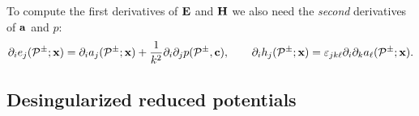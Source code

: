 \documentclass[letterpaper]{article}
\begin{document}
To compute the first derivatives of $\mathbf{E}$ and $\mathbf{H}$ we also
need the \textit{second} derivatives of $\mathbf{a}$ and $p$:
$$ \partial_i e_j(\mathcal{P}^\pm; \mathbf{x})
   =   \partial_i a_j(\mathcal{P}^\pm; \mathbf{x}) 
     + \frac{1}{k^2}\partial_i \partial_j p(\mathcal{P}^\pm, \mathbf{c}),
  \qquad
   \partial_i h_j(\mathcal{P}^\pm; \mathbf{x})
   =\varepsilon_{jk\ell} \partial_i \partial_k a_\ell(\mathcal{P}^\pm; \mathbf{x}).
$$

\subsection{Desingularized reduced potentials}
\end{document}
